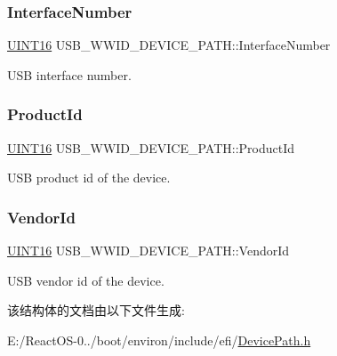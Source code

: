 \subsubsection{\texorpdfstring{Interface\+Number}{InterfaceNumber}}
{\footnotesize\ttfamily \hyperlink{_processor_bind_8h_a09f1a1fb2293e33483cc8d44aefb1eb1}{U\+I\+N\+T16} U\+S\+B\+\_\+\+W\+W\+I\+D\+\_\+\+D\+E\+V\+I\+C\+E\+\_\+\+P\+A\+T\+H\+::\+Interface\+Number}

U\+SB interface number. \mbox{\label{struct_u_s_b___w_w_i_d___d_e_v_i_c_e___p_a_t_h_a4c6a4534c5e2023d00878108ffe7a21a}} 
\subsubsection{\texorpdfstring{Product\+Id}{ProductId}}
{\footnotesize\ttfamily \hyperlink{_processor_bind_8h_a09f1a1fb2293e33483cc8d44aefb1eb1}{U\+I\+N\+T16} U\+S\+B\+\_\+\+W\+W\+I\+D\+\_\+\+D\+E\+V\+I\+C\+E\+\_\+\+P\+A\+T\+H\+::\+Product\+Id}

U\+SB product id of the device. \mbox{\label{struct_u_s_b___w_w_i_d___d_e_v_i_c_e___p_a_t_h_aac7aee63e909b9e5c013494e3147985b}} 
\subsubsection{\texorpdfstring{Vendor\+Id}{VendorId}}
{\footnotesize\ttfamily \hyperlink{_processor_bind_8h_a09f1a1fb2293e33483cc8d44aefb1eb1}{U\+I\+N\+T16} U\+S\+B\+\_\+\+W\+W\+I\+D\+\_\+\+D\+E\+V\+I\+C\+E\+\_\+\+P\+A\+T\+H\+::\+Vendor\+Id}

U\+SB vendor id of the device. 

该结构体的文档由以下文件生成\+:\begin{DoxyCompactItemize}
\item 
E\+:/\+React\+O\+S-\/0../boot/environ/include/efi/\hyperlink{_device_path_8h}{Device\+Path.\+h}\end{DoxyCompactItemize}
